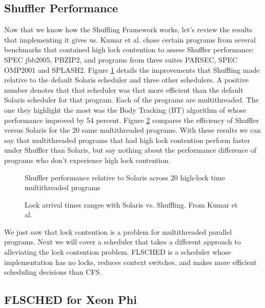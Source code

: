 \documentclass{sig-alternate}
\begin{document}
\subsection{Shuffler Performance}

Now that we know how the Shuffling Framework works, let's review the results that implementing it gives us. Kumar et al. chose certain programs from several benchmarks that contained high lock contention to assess Shuffler performance: SPEC jbb2005, PBZIP2, and programs from three suites PARSEC, SPEC OMP2001 and SPLASH2. Figure \ref{fig:shuf_performance} details the improvements that Shuffling made relative to the default Solaris scheduler and three other schedulers. A positive number denotes that that scheduler was that more efficient than the default Solaris scheduler for that program. Each of the programs are multithreaded. The one they highlight the most was the Body Tracking (BT) algorithm of whose performance improved by 54 percent. Figure \ref{fig:shuf_vs_solaris} compares the efficiency of Shuffler versus Solaris for the 20 same multithreaded programs. With these results we can say that multithreaded programs that had high lock contention perform faster under Shuffler than Solaris, but say nothing about the performance difference of programs who don't experience high lock contention.~\cite{Kumar:2014}
\begin{figure}
\centering
{}
\caption{Shuffler performance relative to Solaris across 20 high-lock time multithreaded programs~\cite{Kumar:2014}}
\label{fig:shuf_performance}
\end{figure}

\begin{figure}
\centering
{}
\caption{Lock arrival times ranges with Solaris vs. Shuffling. From Kumar et al.~\cite{Kumar:2014}}
\label{fig:shuf_vs_solaris}
\end{figure}

We just saw that lock contention is a problem for multithreaded parallel programs. Next we will cover a scheduler that takes a different approach to alleviating the lock contention problem. FLSCHED is a scheduler whose implementation has no locks, reduces context switches, and makes more efficient scheduling decisions than CFS.~\cite{Jo:2017}

\subsection{FLSCHED for Xeon Phi}
\label{sec:flsched}
\end{document}
